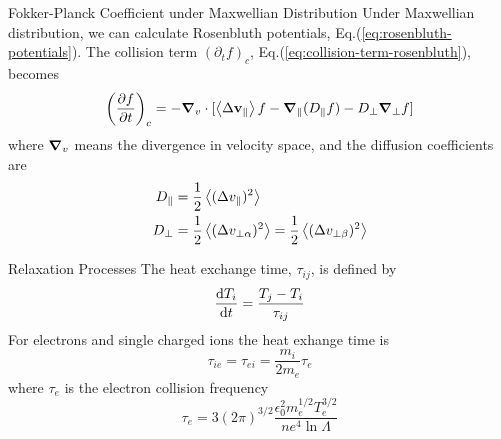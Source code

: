 \begin{frame}{Fokker-Planck Coefficient under Maxwellian Distribution}
    Under Maxwellian distribution, we can calculate Rosenbluth potentials, Eq.(\ref{eq:rosenbluth-potentials}). The collision term $(\partial_t f)_c$, Eq.(\ref{eq:collision-term-rosenbluth}), becomes
    \begin{equation}
        \left(\pdv{f}{t}\right)_c = -\grad_v\cdot[\expval{\Delta\mathbf{v}_\parallel}f - \grad_\parallel(D_\parallel f) - D_\perp\grad_\perp f]
        \label{eq:collision-term-form}
    \end{equation}
    where $\grad_v$ means the divergence in velocity space, and the diffusion coefficients are
    \begin{align}
        D_\parallel & = \frac{1}{2}\expval{(\Delta v_\parallel)^2}                                                     \\
        D_\perp     & = \frac{1}{2}\expval{(\Delta v_{\perp\alpha})^2} = \frac{1}{2}\expval{(\Delta v_{\perp\beta})^2}
    \end{align}
\end{frame}

\begin{frame}{Relaxation Processes}
    The heat exchange time, $\tau_{ij}$, is defined by
    \begin{equation}
        \dv{T_i}{t} = \frac{T_j - T_i}{\tau_{ij}}
        \label{eq:heat-exchange-time-definition}
    \end{equation}
    For electrons and single charged ions the heat exhange time is
    \begin{equation}
        \tau_{ie} = \tau_{ei} = \frac{m_i}{2m_e}\tau_e
        \label{eq:heat-exchange-time-electron-ion}
    \end{equation}
    where $\tau_e$ is the electron collision frequency
    \begin{equation}
        \tau_e = 3(2\pi)^{3/2}\frac{\epsilon_0^2m_e^{1/2}T_e^{3/2}}{ne^4\ln\Lambda}
        \label{eq:electron-collision-frequency}
    \end{equation}
\end{frame}

